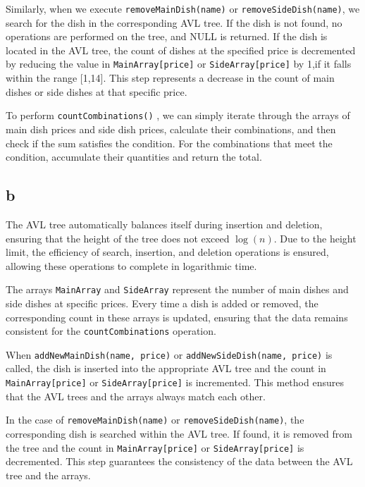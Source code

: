 \documentclass[12pt]{article}
\begin{document}
        Similarly, when we execute \texttt{removeMainDish(name)} or \texttt{removeSideDish(name)}, we search for the dish in the corresponding AVL tree. If the dish is not found, no operations are performed on the tree, and NULL is returned. If the dish is located in the AVL tree, the count of dishes at the specified price is decremented by reducing the value in \texttt{MainArray[price]} or \texttt{SideArray[price]} by 1,if it falls within the range [1,14]. This step represents a decrease in the count of main dishes or side dishes at that specific price.

        To perform \texttt{countCombinations()} , we can simply iterate through the arrays of main dish prices and side dish prices, calculate their combinations, and then check if the sum satisfies the condition. For the combinations that meet the condition, accumulate their quantities and return the total.

    \subsection*{b}
        The AVL tree automatically balances itself during insertion and deletion, ensuring that the height of the tree does not exceed $\log (n)$. Due to the height limit, the efficiency of search, insertion, and deletion operations is ensured, allowing these operations to complete in logarithmic time.

        The arrays \texttt{MainArray} and \texttt{SideArray} represent the number of main dishes and side dishes at specific prices. Every time a dish is added or removed, the corresponding count in these arrays is updated, ensuring that the data remains consistent for the \texttt{countCombinations} operation.

        When \texttt{addNewMainDish(name, price)} or \texttt{addNewSideDish(name, price)} is called, the dish is inserted into the appropriate AVL tree and the count in \texttt{MainArray[price]} or \texttt{SideArray[price]} is incremented. This method ensures that the AVL trees and the arrays always match each other.

        In the case of \texttt{removeMainDish(name)} or \texttt{removeSideDish(name)}, the corresponding dish is searched within the AVL tree. If found, it is removed from the tree and the count in \texttt{MainArray[price]} or \texttt{SideArray[price]} is decremented. This step guarantees the consistency of the data between the AVL tree and the arrays.
\end{document}
